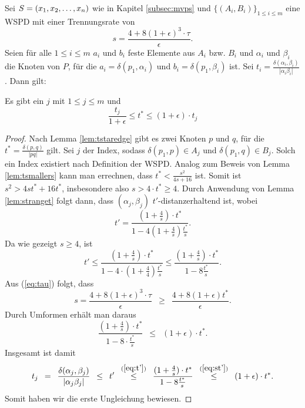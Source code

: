 Sei $S = (x_1, x_2, \mathellipsis, x_n)$ wie in Kapitel \ref{subsec:mvps} und $\{(A_i, B_i)\}_{1 \leq i \leq m}$ eine WSPD mit einer Trennungsrate von 
\[
s = \frac{4 + 8(1 + \epsilon)^3 \cdot \tau}{\epsilon}.
\]
Seien für alle $1 \leq i \leq m$ $a_i$ und $b_i$ feste Elemente aus $A_i$ bzw. $B_i$ und $\alpha_i$ und $\beta_i$ die Knoten von $P$, für die $a_i = \delta(p_1, \alpha_i)$ und $b_i = \delta(p_1, \beta_i)$ ist. 
Sei $t_i = \frac{\delta(\alpha_i, \beta_i)}{|\alpha_i \beta_i|}$. Dann gilt:
\begin{lemma}
	\label{lem:tstartj}
	Es gibt ein $j$ mit $1 \leq j \leq m$ und
	\[
		\frac{t_j}{1 + \epsilon} \leq t^* \leq (1 + \epsilon) \cdot t_j
	\]
\end{lemma}
\begin{proof}
	Nach Lemma \ref{lem:tstaredge} gibt es zwei Knoten $p$ und $q$, für die $t^* = \frac{\delta(p, q)}{|pq|}$ gilt. Sei $j$ der Index, sodass $\delta(p_1, p) \in A_j$ und $\delta(p_1, q) \in B_j$. Solch ein Index existiert nach Definition der WSPD. Analog zum Beweis von Lemma \ref{lem:tsmallers} kann man errechnen, dass $t^* < \frac{s^2}{4s + 16}$ ist. Somit ist $s^2 > 4st^* + 16t^*$, insbesondere also $s > 4\cdot t^* \geq 4$. 
	Durch Anwendung von Lemma \ref{lem:stranget} folgt dann, dass $(\alpha_j, \beta_j)$ $t'$-distanzerhaltend ist, wobei
	\[
	t' = \frac{(1 + \frac{4}{s}) \cdot t^*}{1 - 4(1 + \frac{4}{s})\frac{t^*}{s}}.
	\]
	Da wie gezeigt $s \geq 4$, ist
	\[
	\label{eq:t'}
	t' \leq  \frac{(1 + \frac{4}{s}) \cdot t^*}{1 - 4 \cdot (1 + \frac{4}{4}) \frac{t^*}{s}}
	\leq \frac{(1 + \frac{4}{s}) \cdot t^*}{1 - 8\frac{t^*}{s}}. \tag{1}
	\]
	Aus (\ref{eq:tau}) folgt, dass 
	\[
	s = \frac{4 + 8(1 + \epsilon)^3 \cdot \tau}{\epsilon} 
	\enspace\geq\enspace \frac{4 + 8(1 + \epsilon)t^*}{\epsilon}.
	\]
	Durch Umformen erhält man daraus
	\[
	\label{eq:st'}
	\frac{(1 + \frac{4}{s})\cdot t^*}{1 - 8 \cdot \frac{t^*}{s}} 
	\enspace\leq\enspace (1 + \epsilon)\cdot t^*. \tag{2}
	\]
	Insgesamt ist damit
	\[
	t_j 
	\enspace = \enspace \frac{\delta(\alpha_j, \beta_j)}{|\alpha_j \beta_j|} 
	\enspace\leq\enspace t' 
	\enspace\stackrel{(\ref{eq:t'})}{\leq}\enspace \frac{(1 + \frac{4}{s}) \cdot t^*}{1 - 8\frac{t^*}{s}}
	\enspace\stackrel{(\ref{eq:st'})}{\leq}\enspace (1 + \epsilon)\cdot t^*.
	\]
	Somit haben wir die erste Ungleichung bewiesen.
	

\end{proof}
